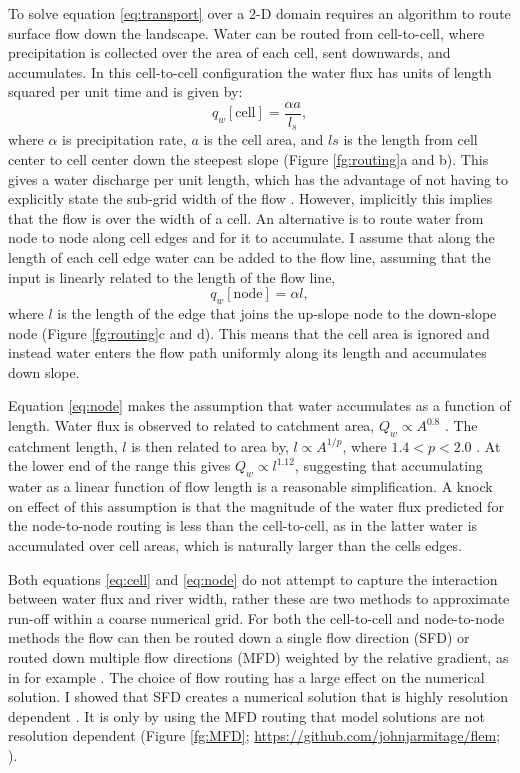 To solve equation \ref{eq:transport} over a 2-D domain requires an algorithm to route surface flow down the landscape. Water can be routed from cell-to-cell, where precipitation is collected over the area of each cell, sent downwards, and accumulates. In this cell-to-cell configuration the water flux has units of length squared per unit time and is given by: 
\begin{equation}
q_{w}\mathrm{[cell]} = \frac{\alpha a}{l_{s}},
\label{eq:cell}
\end{equation}
where $\alpha$ is precipitation rate, $a$ is the cell area, and $l{s}$ is the length from cell center to cell center down the steepest slope (Figure \ref{fg:routing}a and b). This gives a water discharge per unit length, which has the advantage of not having to explicitly state the sub-grid width of the flow \citep{simpson-2003}. However, implicitly this implies that the flow is over the width of a cell. An alternative is to route water from node to node along cell edges and for it to accumulate. I assume that along the length of each cell edge water can be added to the flow line, assuming that the input is linearly related to the length of the flow line, 
\begin{equation}
q_{w}\mathrm{[node]} = \alpha l,
\label{eq:node}
\end{equation}
where $l$ is the length of the edge that joins the up-slope node to the down-slope node (Figure \ref{fg:routing}c and d). This means that the cell area is ignored and instead water enters the flow path uniformly along its length and accumulates down slope.

Equation \ref{eq:node} makes the assumption that water accumulates as a function of length. Water flux is observed to related to catchment area, $Q_{w} \propto A^{0.8}$ \citep{syvitski-2007}. The catchment length, $l$ is then related to area by, $l\propto A^{1/p}$, where $1.4<p<2.0$ \citep{armitage-etal-esurf-2018}. At the lower end of the range this gives $Q_{w} \propto l^{1.12}$, suggesting that accumulating water as a linear function of flow length is a reasonable simplification. A knock on effect of this assumption is that the magnitude of the water flux predicted for the node-to-node routing is less than the cell-to-cell, as in the latter water is accumulated over cell areas, which is naturally larger than the cells edges.

Both equations \ref{eq:cell} and \ref{eq:node} do not attempt to capture the interaction between water flux and river width, rather these are two methods to approximate run-off within a coarse numerical grid. For both the cell-to-cell and node-to-node methods the flow can then be routed down a single flow direction (SFD) or routed down multiple flow directions (MFD) weighted by the relative gradient, as in for example \cite{schoorl-etal-2000}. The choice of flow routing has a large effect on the numerical solution. I showed that SFD creates a numerical solution that is highly resolution dependent \citep{armitage-2019}. It is only by using the MFD routing that model solutions are not resolution dependent (Figure \ref{fg:MFD}; \url{https://github.com/johnjarmitage/flem}; \citealp{armitage-2019}).

